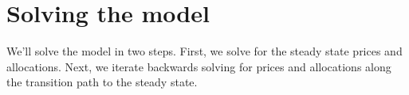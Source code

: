 \documentclass[article,11pt,letterpaper,fleqn]{article}
\theoremstyle{definition}
\numberwithin{equation}{section}
\begin{document}
%
%

\section{Solving the model}

We'll solve the model in two steps.  First, we solve for the steady state prices and allocations.  Next, we iterate backwards solving for prices and allocations along the transition path to the steady state.
\end{document}
